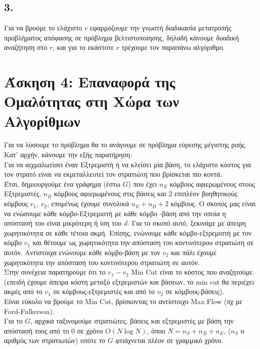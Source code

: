 	\subsection*{3.}

		Για να βρούμε το ελάχιστο $r$ εφαρμόζουμε την γνωστή διαδικασία μετατροπής προβλήματος απόφασης σε πρόβλημα βελτιστοποίησης, δηλαδή κάνουμε δυαδική αναζήτηση στο $r$, και για το εκάστοτε $r$ τρέχουμε τον παραπάνω αλγόριθμο.

\section*{Άσκηση 4: Επαναφορά της Ομαλότητας στη Χώρα των Αλγορίθμων}

	Για να λύσουμε το πρόβλημα θα το ανάγουμε σε πρόβλημα εύρεσης μέγιστης ροής. \\
	
	Κατ' αρχήν, κάνουμε την εξής παρατήρηση: \\
	Για να αιχμαλωτίσει έναν Εξτρεμιστή ή να κλείσει μία βάση, το ελάχιστο κόστος για τον στρατό είναι να εκμεταλλευτεί τον στρατιώτη που βρίσκεται πιο κοντά. \\
	
	Έτσι, δημιουργούμε ένα γράφημα (έστω $G$) που έχει $n_E$ κόμβους αφιερωμένους στους Εξτρεμιστές, $n_B$ κόμβους αφιερωμένους στις βάσεις και $2$ επιπλέον βοηθητικούς κόμβους $v_1$, $v_2$, επομένως έχουμε συνολικά $n_E + n_B + 2$ κόμβους. Ο σκοπός μας είναι να ενώσουμε κάθε κόμβο-Εξτρεμιστή με κάθε κόμβο -βάση από την οποία η απόστασή του είναι μικρότερη ή ίση του $d$. Για το σκοπό αυτό, ξεκινάμε με άπειρη χωρητικότητα σε κάθε τέτοια ακμή. Επίσης, ενώνουμε κάθε κόμβο-εξτρεμιστή με τον κόμβο $v_1$ και θέτουμε ως χωρητικότητα την απόσταση του κοντινότερου στρατιώτη σε αυτόν. Αντίστοιχα ενώνουμε κάθε κόμβο-βάση με τον $v_2$ και πάλι έχουμε χωρητικότητα την απόσταση του κοντινότερου στρατιώτη σε αυτόν.\\
	
	Στην συνέχεια παρατηρούμε ότι το $v_1 - v_2$ Min Cut είναι το κόστος που αναζητούμε. (επειδή έχουμε άπειρα κόστη μεταξύ εξτρεμιστών και βάσεων, το min cut θα περιέχει ακμές από το $v_1$ σε κόμβους-εξτρεμιστές και από το $v_2$ σε κόμβους-βάσεις). \\
	
	Είναι εύκολο να βρούμε το Min Cut, βρίσκοντας το αντίστοιχο Max Flow (πχ με Ford-Fulkerson). \\
	
	Για το $G$, αρχικά ταξινομούμε στρατιώτες, βάσεις και εξτρεμιστές με βάση την απόστασή τους από το $0$ σε χρόνο $O(N \log N)$, όπου $N = n_S + n_B + n_E$, ($n_S$ ο αριθμός των στρατιωτών) οπότε το $G$ φτιάχνεται πλέον σε γραμμικό χρόνο. \\
	
